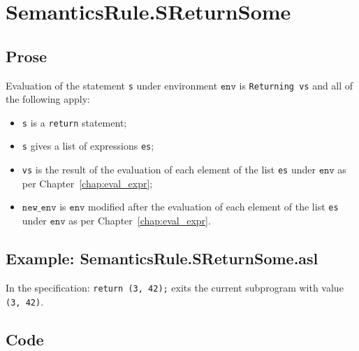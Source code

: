 \documentclass{book}
\newcommand\newenv[0]{\texttt{new\_env}}
\newcommand\env[0]{\texttt{env}}
\begin{document}

\section{SemanticsRule.SReturnSome \label{sec:SemanticsRule.SReturnSome}}

    \subsection{Prose}
Evaluation of the statement \texttt{s} under environment $\env$ is
\texttt{Returning vs} and all of the following apply:
    \begin{itemize}
    \item \texttt{s} is a \texttt{return} statement;
    \item \texttt{s} gives a list of expressions \texttt{es};
    \item \texttt{vs} is the result of the evaluation of each element of the list \texttt{es} under $\env$ as per Chapter~\ref{chap:eval_expr};
    \item $\newenv$ is $\env$ modified after the evaluation of each element of the list \texttt{es} under $\env$ as per Chapter~\ref{chap:eval_expr}.
    \end{itemize}

    \subsection{Example: SemanticsRule.SReturnSome.asl}
    In the specification:
    \texttt{return (3, 42);} exits the current subprogram with value \texttt{(3, 42)}.

  \subsection{Code}
\end{document}
